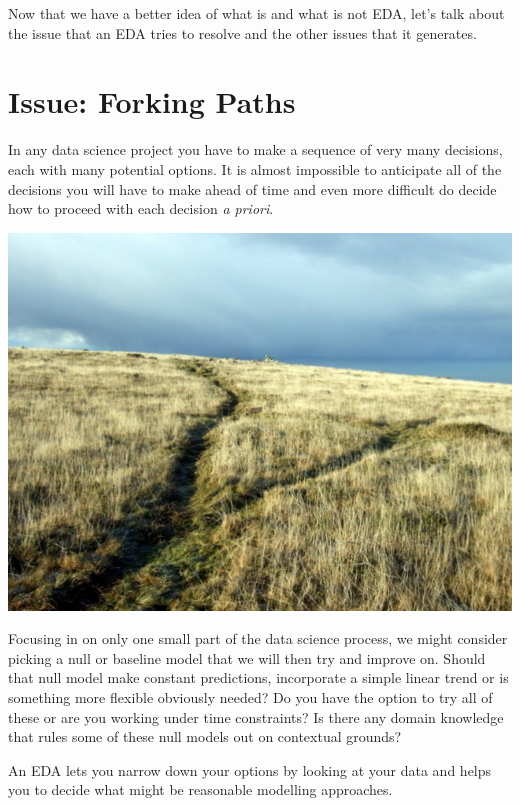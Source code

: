 \documentclass[
  letterpaper,
  DIV=11,
  numbers=noendperiod]{scrreprt}
\begin{document}
Now that we have a better idea of what is and what is not EDA, let's
talk about the issue that an EDA tries to resolve and the other issues
that it generates.

\section{Issue: Forking Paths}\label{issue-forking-paths}

In any data science project you have to make a sequence of very many
decisions, each with many potential options. It is almost impossible to
anticipate all of the decisions you will have to make ahead of time and
even more difficult do decide how to proceed with each decision \emph{a
priori}.

\includegraphics{images/302-data-exploration/forking-paths.jpg}

Focusing in on only one small part of the data science process, we might
consider picking a null or baseline model that we will then try and
improve on. Should that null model make constant predictions,
incorporate a simple linear trend or is something more flexible
obviously needed? Do you have the option to try all of these or are you
working under time constraints? Is there any domain knowledge that rules
some of these null models out on contextual grounds?

An EDA lets you narrow down your options by looking at your data and
helps you to decide what might be reasonable modelling approaches.
\end{document}
